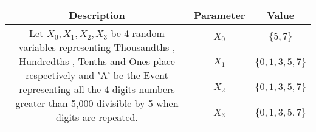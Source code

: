 
\providecommand{\pr}[1]{\ensuremath{\Pr\left(#1\right)}}


\begin{center}
\large \begin{tabular}{|c|c|c|}
     \hline
     Description & Parameter & Value  \\
     \hline 
     \multirow{4}{*}{\parbox{13cm}{Let $X_0 , X_1 , X_2 , X_3$ be 4 random variables representing Thousandths , Hundredths , Tenths and Ones place respectively and 'A' be the Event representing all the 4-digits numbers greater than 5,000 divisible by 5 when digits are repeated.}} & $X_0$ &  $\{5,7\}$ \\
                          & $X_1$ &  $\{0,1,3,5,7\}$  \\
                          & $X_2$ &  $\{0,1,3,5,7\}$  \\
                          & $X_3$ &  $\{0,1,3,5,7\}$  \\
     \hline
 \end{tabular} 
 \end{center}
